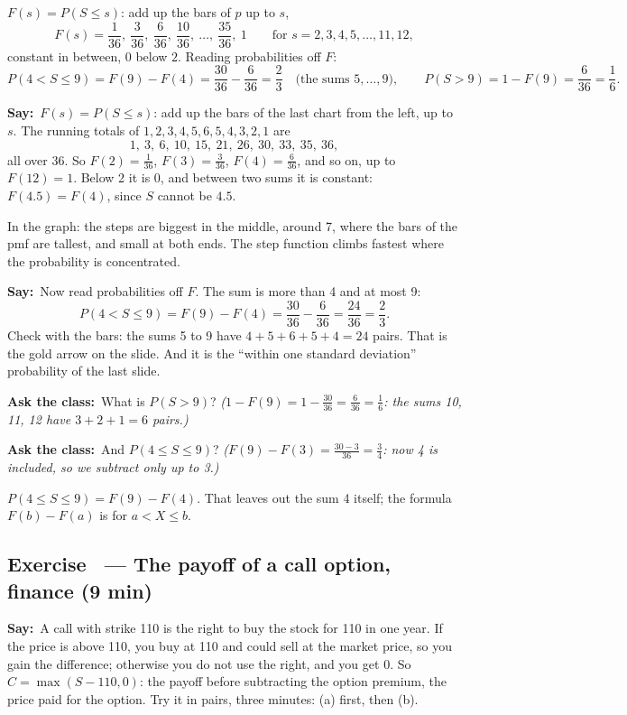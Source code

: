 \documentclass[11pt,a4paper,parskip=half]{scrartcl}
\newcommand{\say}{\textbf{\color{teal}Say:}\ }
\newcommand{\ask}{\textbf{\color{navy}Ask the class:}\ }
\begin{document}
\begin{onslide}
	$F(s)=P(S\le s)$: add up the bars of $p$ up to $s$,
	\[ F(s)=\frac{1}{36},\ \frac{3}{36},\ \frac{6}{36},\ \frac{10}{36},\ \dots,\
		\frac{35}{36},\ 1\qquad\text{for } s=2,3,4,5,\dots,11,12, \]
	constant in between, $0$ below $2$. Reading probabilities off $F$:
	\[ P(4<S\le9)=F(9)-F(4)=\frac{30}{36}-\frac{6}{36}=\frac23
		\quad\text{(the sums $5,\dots,9$)},\qquad
		P(S>9)=1-F(9)=\frac{6}{36}=\frac16. \]
\end{onslide}

\say $F(s)=P(S\le s)$: add up the bars of the last chart from the left, up
to $s$. The running totals of $1,2,3,4,5,6,5,4,3,2,1$ are
\[ 1,\ 3,\ 6,\ 10,\ 15,\ 21,\ 26,\ 30,\ 33,\ 35,\ 36, \]
all over 36. So $F(2)=\tfrac1{36}$, $F(3)=\tfrac3{36}$, $F(4)=\tfrac6{36}$,
and so on, up to $F(12)=1$. Below 2 it is 0, and between two sums it is
constant: $F(4.5)=F(4)$, since $S$ cannot be $4.5$.

In the graph: the steps are biggest in the middle, around 7, where the
bars of the pmf are tallest, and small at both ends. The step function
climbs fastest where the probability is concentrated.

\say Now read probabilities off $F$. The sum is more than 4 and at most 9:
\[ P(4<S\le9)=F(9)-F(4)=\frac{30}{36}-\frac{6}{36}=\frac{24}{36}=\frac23. \]
Check with the bars: the sums 5 to 9 have $4+5+6+5+4=24$ pairs. That is
the gold arrow on the slide. And it is the ``within one standard
deviation'' probability of the last slide.

\ask What is $P(S>9)$? \emph{($1-F(9)=1-\tfrac{30}{36}=\tfrac{6}{36}=\tfrac16$:
the sums 10, 11, 12 have $3+2+1=6$ pairs.)}

\ask And $P(4\le S\le9)$? \emph{($F(9)-F(3)=\tfrac{30-3}{36}=\tfrac34$:
now 4 is included, so we subtract only up to 3.)}

\begin{mistake}
	$P(4\le S\le9)=F(9)-F(4)$. That leaves out the sum 4 itself; the
	formula $F(b)-F(a)$ is for $a<X\le b$.
\end{mistake}

\needspace{0.25\textheight}
\subsection{Exercise~ --- The payoff of a call option, finance (9 min)}


\say A call with strike 110 is the right to buy the stock for 110 in one
year. If the price is above 110, you buy at 110 and could sell at the
market price, so you gain the difference; otherwise you do not use the
right, and you get 0. So $C=\max(S-110,0)$: the payoff before subtracting
the option premium, the price paid for the option. Try it in pairs, three
minutes: (a) first, then (b).
\end{document}
